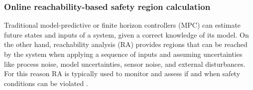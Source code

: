 \subsubsection{Online reachability-based safety region calculation}
\label{subsec:online_reach}

Traditional model-predictive or finite horizon controllers (MPC) \cite{bernardini2012stabilizing, elnaggar17AHS, bezzo2016stochastic} can estimate future states and inputs of a system, given a correct knowledge of its model. On the other hand, reachability analysis (RA) \cite{TomlinRAM11, TomlinICRA11, esen18ICRA, esen17AHS, esen17ISAR} provides regions that can be reached by the system when applying a sequence of inputs and assuming uncertainties like process noise, model uncertainties, sensor noise, and external disturbances. For this reason RA is typically used to monitor and assess if and when safety conditions can be violated \cite{gillula2011applications, gillula2010design, althoff2010reachability}.

